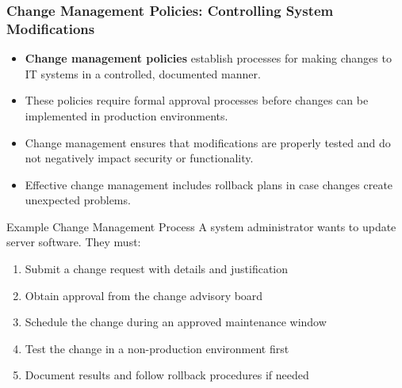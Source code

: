 \documentclass{beamer}
\begin{document}
\begin{frame}
\frametitle{Change Management Policies: Controlling System Modifications}
\begin{itemize}
\item \textbf{Change management policies} establish processes for making changes to IT systems in a controlled, documented manner.
\item These policies require formal approval processes before changes can be implemented in production environments.
\item Change management ensures that modifications are properly tested and do not negatively impact security or functionality.
\item Effective change management includes rollback plans in case changes create unexpected problems.
\end{itemize}

\begin{exampleblock}{Example Change Management Process}
\scriptsize
A system administrator wants to update server software. They must:
\begin{enumerate}
\item Submit a change request with details and justification
\item Obtain approval from the change advisory board
\item Schedule the change during an approved maintenance window
\item Test the change in a non-production environment first
\item Document results and follow rollback procedures if needed
\end{enumerate}
\end{exampleblock}
\end{frame}
\end{document}
